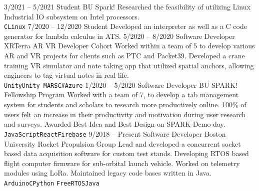 \documentclass[9pt]{developercv} %
\begin{document}
\begin{entrylist}
  \entry
  {3/2021 -- 5/2021}
  {Student}
  {BU Spark!}
  {Researched the feasibility of utilizing Linux Industrial IO subsystem on Intel processors.\\
  \texttt{C}\slashsep\texttt{Linux}}
  \entry
  {7/2020 -- 12/2020}
  {Student}
  {}
  {Developed an interpreter as well as a C code generator for lambda calculus in ATS.}
  \entry
  {5/2020 -- 8/2020}
  {Software Developer}
  {XRTerra AR VR Developer Cohort}
  {Worked within a team of 5 to develop various AR and VR projects for clients such as PTC
    and Packet39. Developed a crane training VR simulator and note taking app that utilized
    spatial anchors, allowing engineers to tag virtual notes in real life.\\
    \texttt{Unity}\slashsep\texttt{Unity MARS}\slashsep\texttt{C\#}\slashsep\texttt{Azure}}
  \entry
  {1/2020 -- 5/2020}
  {Software Developer}
  {BU SPARK! Fellowship Program}
  {Worked with a team of 7, to develop a tab management system for students and
    scholars to research more productively online. 100\% of users felt an increase in
    their productivity and motivation during user research and surveys. Awarded Best
    Idea and Best Design on SPARK Demo day.\\
    \texttt{JavaScript}\slashsep\texttt{React}\slashsep\texttt{Firebase}}
  \entry
  {9/2018 -- Present}
  {Software Developer}
  {Boston University Rocket Propulsion Group}
  {Lead and developed a concurrent socket based data acquisition software for custom test stands.
    Developing RTOS based flight computer firmware for sub-orbital launch vehicle. Worked
    on telemetry modules using LoRa. Maintained legacy code bases written in Java.\\\texttt{Arduino}\slashsep\texttt{C}\slashsep\texttt{Python}
    \slashsep\texttt{FreeRTOS}\slashsep\texttt{Java}}

\end{entrylist}
\end{document}
